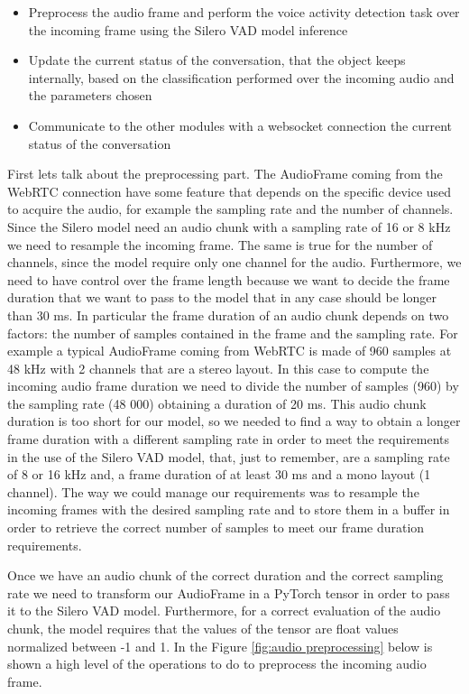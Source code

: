 \documentclass[../main.tex]{subfiles}
\begin{document}
\begin{itemize}
    \item Preprocess the audio frame and perform the voice activity detection task over the incoming frame using the Silero VAD model inference
    \item Update the current status of the conversation, that the object keeps internally, based on the classification performed over the incoming audio and the parameters chosen 
    \item Communicate to the other modules with a websocket connection the current status of the conversation
\end{itemize}

First lets talk about the preprocessing part. The AudioFrame coming from the WebRTC connection have some feature that depends on the specific device used to acquire the audio, for example the sampling rate and the number of channels. Since the Silero model need an audio chunk with a sampling rate of 16 or 8 kHz we need to resample the incoming frame. The same is true for the number of channels, since the model require only one channel for the audio. Furthermore, we need to have control over the frame length because we want to decide the frame duration that we want to pass to the model that in any case should be longer than 30 ms. In particular the frame duration of an audio chunk depends on two factors: the number of samples contained in the frame and the sampling rate. For example a typical AudioFrame coming from WebRTC is made of 960 samples at 48 kHz with 2 channels that are a stereo layout. In this case to compute the incoming audio frame duration we need to divide the number of samples (960) by the sampling rate (48 000) obtaining a duration of 20 ms. This audio chunk duration is too short for our model, so we needed to find a way to obtain a longer frame duration with a different sampling rate in order to meet the requirements in the use of the Silero VAD model, that, just to remember, are a sampling rate of 8 or 16 kHz and, a frame duration of at least 30 ms and a mono layout (1 channel). The way we could manage our requirements was to resample the incoming frames with the desired sampling rate and to store them in a buffer in order to retrieve the correct number of samples to meet our frame duration requirements.

Once we have an audio chunk of the correct duration and the correct sampling rate we need to transform our AudioFrame in a PyTorch tensor in order to pass it to the Silero VAD model. Furthermore, for a correct evaluation of the audio chunk, the model requires that the values of the tensor are float values normalized between -1 and 1. In the Figure \ref{fig:audio preprocessing} below is shown a high level of the operations to do to preprocess the incoming audio frame.
\end{document}

